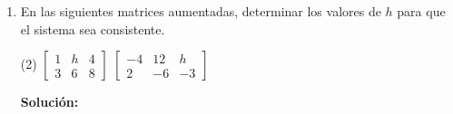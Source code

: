 \documentclass[12pt]{article}
\newenvironment{solucion}
{\begin{mdframed}[backgroundcolor=black!10]
		{\bf Solución:}\\
	}
	{
	\end{mdframed}
}
\newenvironment{preguntas}
{\begin{enumerate}\itemsep12pt
	}
	{
	\end{enumerate}
}
\newcommand{\ra}{\rightarrow}
\newcommand{\widesim}[2][1.5]{
	\mathrel{\overset{#2}{\scalebox{#1}[1]{$\sim$}}}
}
\newcommand{\wsim}{\widesim{}}
\begin{document}
\begin{preguntas}
\begin{solucion}
\begin{enumerate}[a)]
$$\begin{bmatrix}
1 & 1 & 1 & 1\\
0 & 1 & 0 & \frac{1}{1+a}\\
0 & 0 & 1 & 0\\
0 & 0 & 0 & 0
\end{bmatrix}
\stackbin[F_1-F_3]{F_1 - F_2}{\wsim}
\begin{bmatrix}
1 & 0 & 0 & \frac{a}{1+a}\\
0 & 1 & 0 & \frac{1}{1+a}\\
0 & 0 & 1 & 0\\
0 & 0 & 0 & 0
\end{bmatrix}$$
Luego,
$$\begin{array}{rcl}
x_1 & = & \dfrac{a}{1+a}\\
x_2 & = & \dfrac{1}{1+a}\\
x_3 & = & 0 
\end{array} \ra 
x = \begin{pmatrix}
\frac{a}{1+a} \\
\frac{1}{1+a} \\
0
\end{pmatrix}$$
Notemos que esta última corresponde siempre a una solución única pero que depende de $a$.
\end{enumerate}
\end{solucion}
\item En las siguientes matrices aumentadas, determinar los valores de $h$ para que el sistema sea consistente.
\begin{tasks}(2)
\task $
		\begin{bmatrix}
		1 & h & 4\\
		3 & 6 & 8
		\end{bmatrix}
		$
\task $
		\begin{bmatrix}
		-4 & 12 & h\\
		2 & -6 & -3
		\end{bmatrix}
		$
\end{tasks}
\begin{solucion}


\end{solucion}
\end{preguntas}
\end{document}
